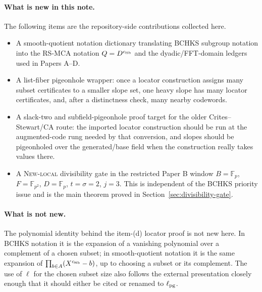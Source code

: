 \documentclass[11pt]{article}
\newcommand{\F}{\mathbb F}
\newcommand{\efib}{c_{\rm fib}}
\newcommand{\ellpg}{\ell_{\rm pg}}
\begin{document}
\paragraph{What is new in this note.}
The following items are the repository-side contributions collected here.
\begin{itemize}
\item A smooth-quotient notation dictionary translating BCHKS subgroup
  notation into the RS-MCA notation \(Q=D^{\efib}\) and the dyadic/FFT-domain
  ledgers used in Papers A--D.
\item A list-fiber pigeonhole wrapper: once a locator construction assigns
  many subset certificates to a smaller slope set, one heavy slope has many
  locator certificates, and, after a distinctness check, many nearby
  codewords.
\item A slack-two and subfield-pigeonhole proof target for the older
  Crites--Stewart/CA route: the imported locator construction should be run at
  the augmented-code rung needed by that conversion, and slopes should be
  pigeonholed over the generated/base field when the construction really takes
  values there.
\item A \textsc{New-local} divisibility gate in the restricted Paper B window
  \(B=\F_p\), \(F=\F_{p^2}\), \(D=\F_p\), \(t=\sigma=2\), \(j=3\).  This is
  independent of the BCHKS priority issue and is the main theorem proved in
  Section~\ref{sec:divisibility-gate}.
\end{itemize}

\paragraph{What is not new.}
The polynomial identity behind the item-(d) locator proof is not new here.  In
BCHKS notation it is the expansion of a vanishing polynomial over a complement
of a chosen subset; in smooth-quotient notation it is the same expansion of
\(\prod_{b\in A}(X^{\efib}-b)\), up to choosing a subset or its complement.
The use of \(\ell\) for the chosen subset size also follows the external
presentation closely enough that it should either be cited or renamed to
\(\ellpg\).
\end{document}
